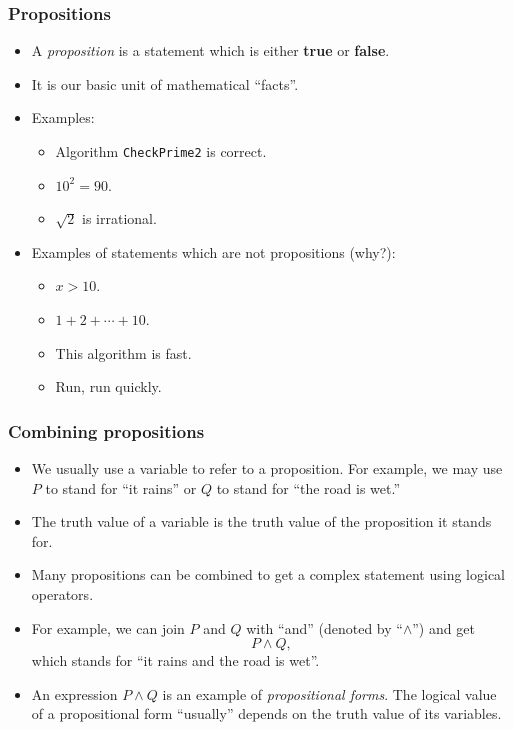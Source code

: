 \begin{frame}\frametitle{Propositions}
  \begin{itemize}
  \item A {\em proposition} is a statement which is either {\bf true}
    or {\bf false}.
    \pause
  \item It is our basic unit of mathematical ``facts''.
    
  \item Examples:
    \begin{itemize}
    \item Algorithm {\tt CheckPrime2} is correct.
    \item $10^2 = 90$.
    \item $\sqrt{2}$ is irrational.
    \end{itemize}

    \pause
  \item Examples of statements which are not propositions (why?):
    \begin{itemize}
    \item $x > 10$.
    \item $1+2+\cdots+10$.
    \item This algorithm is fast.
    \item Run, run quickly.
    \end{itemize}
  \end{itemize}
\end{frame}

\begin{frame}\frametitle{Combining propositions}
  \begin{itemize}
  \item We usually use a variable to refer to a proposition.  For
    example, we may use $P$ to stand for ``it rains'' or $Q$ to stand
    for ``the road is wet.''
    \pause
  \item The truth value of a variable is the truth value of the
    proposition it stands for.
    \pause
  \item Many propositions can be combined to get a complex statement
    using logical operators.  \pause
  \item For example, we can join $P$ and $Q$ with ``and'' (denoted by
    ``$\wedge$'') and get
    \[P\wedge Q,\]
    which stands for ``it rains and the road is wet''.
    \pause
    
  \item An expression $P\wedge Q$ is an example of {\em propositional
    forms}.  The logical value of a propositional form ``usually''
    depends on the truth value of its variables.
  \end{itemize}
\end{frame}

